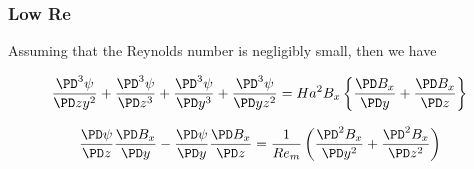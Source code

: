 \documentclass[11pt]{article}
\begin{document}
\subsubsection{Low Re}
Assuming that the Reynolds number is negligibly small, then we have


\begin{equation}
	\frac{\PD^3 \psi}{\PD z y^2}
	+
	\frac{\PD^3 \psi}{\PD z^3}
	+
	\frac{\PD^3 \psi}{\PD y^3}
	+\frac{\PD^3 \psi}{\PD y z^2}
	=
	Ha^2
	B_x
	\left\{
	\frac{\PD B_x}{\PD y}
	+
	\frac{\PD B_x}{\PD z}
	\right\}
\end{equation}

\begin{equation}
	\frac{\PD \psi}{\PD z}
	\frac{\PD B_x}{\PD y}
	-
	\frac{\PD \psi}{\PD y}
	\frac{\PD B_x}{\PD z}
	=
	\frac{1}{Re_m}
	\left(
	\frac{\PD^2 B_x}{\PD y^2}
	+ \frac{\PD^2 B_x}{\PD z^2}
	\right)
\end{equation}












\end{document}
